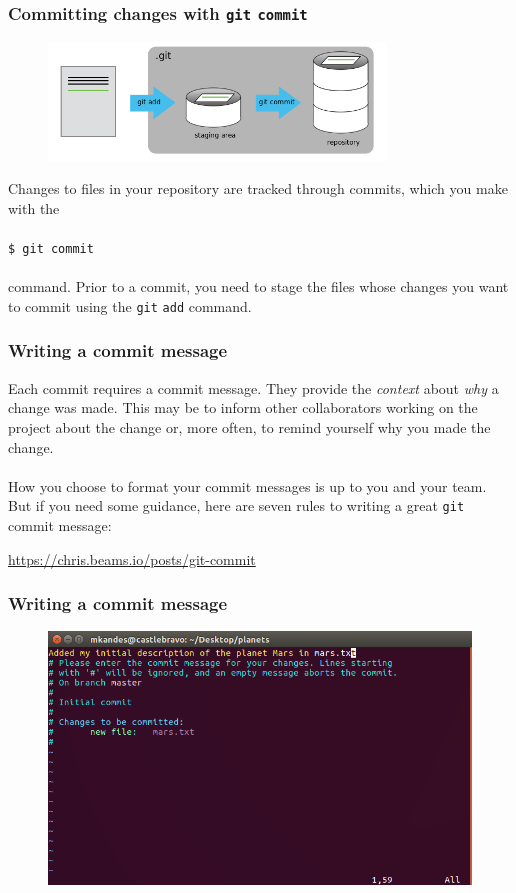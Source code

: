 \documentclass{beamer}
\begin{document}
\begin{frame}
   \frametitle{Committing changes with \texttt{git} \texttt{commit}}
   \begin{figure}[htbp]
      \includegraphics[width=0.8\textwidth]{images/git-staging-area.png}
   \end{figure}
   Changes to files in your repository are tracked through commits, 
   which you make with the 
   \\ \ \\
   \texttt{\hspace{1.0em}\$ git commit}
   \\ \ \\ 
   command. Prior to a commit, you need to stage the files whose changes
   you want to commit using the \texttt{git} \texttt{add} command.
\end{frame}

\begin{frame}
   \frametitle{Writing a commit message}
   Each commit requires a commit message. They provide the 
   \textit{context} about \textit{why} a change was made. This may be 
   to inform other collaborators working on the project about the change 
   or, more often, to remind yourself why you made the change.
   \\ \ \\
   How you choose to format your commit messages is up to you and your 
   team. But if you need some guidance, here are seven rules to writing a 
   great \texttt{git} commit message: \\
   \begin{center}
      \url{https://chris.beams.io/posts/git-commit}
   \end{center}
\end{frame}

\begin{frame}
   \frametitle{Writing a commit message}
   \begin{figure}[htbp]
      \includegraphics[width=1.0\textwidth]{images/git-commit-message.png}
   \end{figure}
\end{frame}
\end{document}
